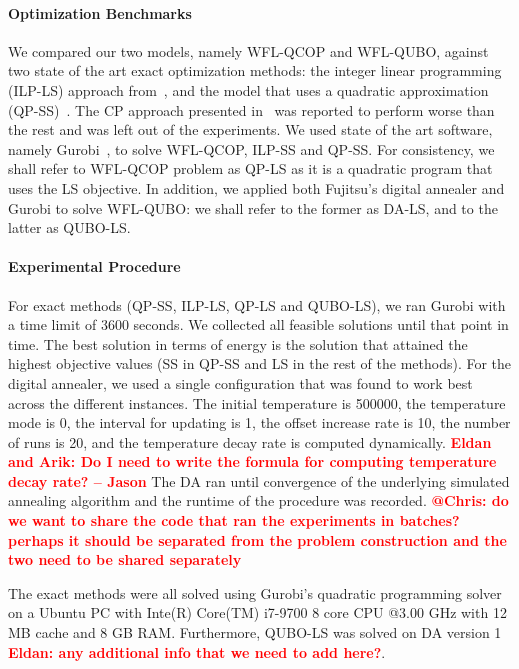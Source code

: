 \documentclass[preprint,12pt]{elsarticle}
\newcommand{\todo}[1]{{\textcolor{red}{\bf {#1}}}}
\begin{document}
\paragraph{Optimization Benchmarks}

We compared our two models, namely WFL-QCOP and WFL-QUBO, against two state of the art exact optimization methods:
the integer linear programming (ILP-LS) approach from~\cite{donovan2005wind}, and the 
model that uses a quadratic approximation (QP-SS)~\cite{turner2014new}. The CP approach presented in~\cite{Zhang2014} was
reported to perform worse than the rest and was left out of the experiments.
We used state of the art software, namely Gurobi~\cite{gurobi}, to solve WFL-QCOP, ILP-SS and QP-SS. 
For consistency, we shall refer to WFL-QCOP problem as QP-LS as it is a quadratic program that uses the LS objective.
In addition, we 
applied both Fujitsu's digital annealer and Gurobi to solve WFL-QUBO: we shall refer to the former as DA-LS, and to the latter
as QUBO-LS.


\paragraph{Experimental Procedure}

For exact methods (QP-SS, ILP-LS, QP-LS and QUBO-LS),
we ran Gurobi with a time limit of 3600 seconds. We collected all feasible solutions
until that point in time. The best solution in terms of energy is the solution that attained the highest objective
values (SS in QP-SS and LS in the rest of the methods).
For the digital annealer, we used a single configuration that was found to work best across the different instances. The initial temperature is 500000, the temperature mode is 0, the  interval for updating is 1, the offset increase rate is 10, the number of runs is 20, and the temperature decay rate is computed dynamically. \todo{Eldan and Arik: Do I need to write the formula for computing temperature decay rate? -- Jason} The DA ran until convergence of the underlying simulated annealing algorithm and the runtime 
of the procedure was recorded. \todo{@Chris: do we want to share the code that ran the experiments in batches? perhaps it should be separated from the problem construction and the two need to be shared separately} 

The exact methods were all solved using Gurobi's quadratic programming solver on a Ubuntu PC with Inte(R) Core(TM) i7-9700 8 core CPU @3.00 GHz with 12 MB cache and 8 GB RAM. Furthermore, QUBO-LS was solved on DA version 1 \todo{Eldan: any additional info that we need to add here?}.
\end{document}
